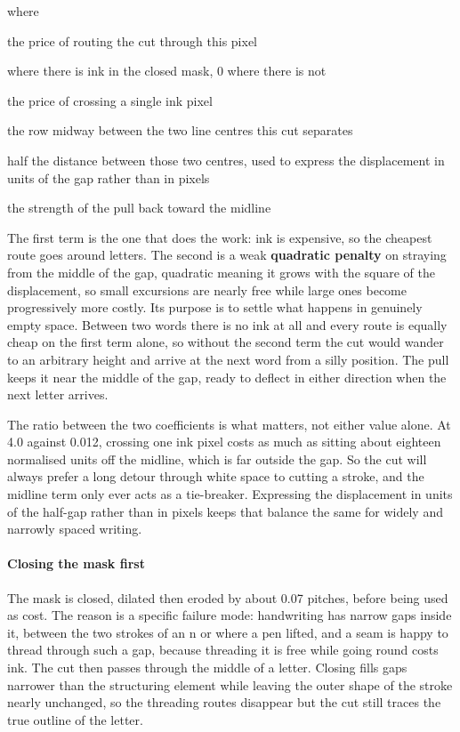 \noindent where
\begin{description}[leftmargin=2.4em,style=nextline,font=\normalfont\ttfamily]\setlength\itemsep{1pt}
  \item[{$\mathrm{cost}[y,x]$}] \normalfont the price of routing the cut through this pixel
  \item[{$m[y,x]$}]  where there is ink in the closed mask, 0 where there is not
  \item[{$4.0$}] \normalfont the price of crossing a single ink pixel
  \item[{$y_{\mathrm{mid}}$}] \normalfont the row midway between the two line centres this cut separates
  \item[{$g$}] \normalfont half the distance between those two centres, used to express the displacement in units of the gap rather than in pixels
  \item[{$0.012$}] \normalfont the strength of the pull back toward the midline
\end{description}
The first term is the one that does the work: ink is expensive, so the cheapest route goes around letters. The second is a weak \textbf{quadratic penalty} on straying from the middle of the gap, quadratic meaning it grows with the square of the displacement, so small excursions are nearly free while large ones become progressively more costly. Its purpose is to settle what happens in genuinely empty space. Between two words there is no ink at all and every route is equally cheap on the first term alone, so without the second term the cut would wander to an arbitrary height and arrive at the next word from a silly position. The pull keeps it near the middle of the gap, ready to deflect in either direction when the next letter arrives.

The ratio between the two coefficients is what matters, not either value alone. At 4.0 against 0.012, crossing one ink pixel costs as much as sitting about eighteen normalised units off the midline, which is far outside the gap. So the cut will always prefer a long detour through white space to cutting a stroke, and the midline term only ever acts as a tie-breaker. Expressing the displacement in units of the half-gap rather than in pixels keeps that balance the same for widely and narrowly spaced writing.


\paragraph{Closing the mask first}
The mask is closed, dilated then eroded by about 0.07 pitches, before being used as cost. The reason is a specific failure mode: handwriting has narrow gaps inside it, between the two strokes of an n or where a pen lifted, and a seam is happy to thread through such a gap, because threading it is free while going round costs ink. The cut then passes through the middle of a letter. Closing fills gaps narrower than the structuring element while leaving the outer shape of the stroke nearly unchanged, so the threading routes disappear but the cut still traces the true outline of the letter.

